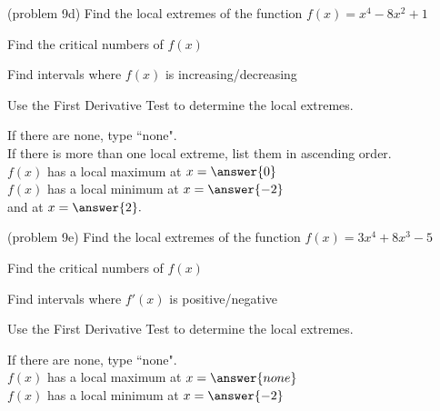 \documentclass[handout]{ximera}
\begin{document}
\begin{problem}(problem 9d)
Find the local extremes of the function $f(x) = x^4 - 8x^2 + 1$
\begin{hint}
Find the critical numbers of $f(x)$
\end{hint}
\begin{hint}
Find intervals where $f(x)$ is increasing/decreasing
\end{hint}
\begin{hint}
Use the First Derivative Test to determine the local extremes.
\end{hint}

If there are none, type ``none".\\
If there is more than one local extreme, list them in ascending order.\\
$f(x)$ has a local maximum at $x = \answer{0}$\\
$f(x)$ has a local minimum at $x = \answer{-2}$\\
and at $x = \answer{2}.$
\end{problem}


\begin{problem}(problem 9e)
Find the local extremes of the function $f(x) = 3x^4 +8x^3 - 5$\\
\begin{hint}
Find the critical numbers of $f(x)$
\end{hint}
\begin{hint}
Find intervals where $f'(x)$ is positive/negative
\end{hint}
\begin{hint}
Use the First Derivative Test to determine the local extremes.
\end{hint}

If there are none, type ``none".\\
$f(x)$ has a local maximum at $x = \answer{none}$\\
$f(x)$ has a local minimum at $x = \answer{-2}$
\end{problem}
\end{document}
